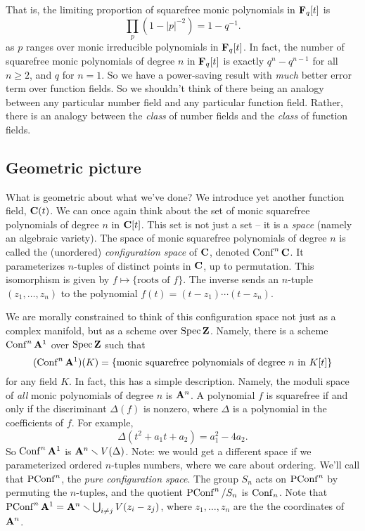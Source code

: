 That is, the limiting proportion of squarefree monic polynomials in 
$\mathbf{F}_q[t]$ is 
\[
  \prod_p \left(1-|p|^{-2}\right) = 1-q^{-1} .
\]
as $p$ ranges over monic irreducible polynomials in $\mathbf{F}_q[t]$. In fact, the 
number of squarefree monic polynomials of degree $n$ in $\mathbf{F}_q[t]$ is exactly 
$q^n-q^{n-1}$ for all $n\geqslant 2$, and $q$ for $n=1$. So we have a 
power-saving result with \emph{much} better error term over function fields. So 
we shouldn't think of there being an analogy between any particular number field 
and any particular function field. Rather, there is an analogy between the 
\emph{class} of number fields and the \emph{class} of function fields. 





\subsection{Geometric picture}

What is geometric about what we've done? We introduce yet another function 
field, $\mathbf{C}(t)$. We can once again think about the set of monic squarefree 
polynomials of degree $n$ in $\mathbf{C}[t]$. This set is not just a set -- it is a 
\emph{space} (namely an algebraic variety). The space of monic squarefree 
polynomials of degree $n$ is called the (unordered) \emph{configuration space} 
of $\mathbf{C}$, denoted $\operatorname{Conf}^n \mathbf{C}$. It parameterizes $n$-tuples of 
distinct points in $\mathbf{C}$, up to permutation. This isomorphism is given by 
$f\mapsto \{\text{roots of $f$}\}$. The inverse sends an $n$-tuple 
$(z_1,\dots,z_n)$ to the polynomial $f(t)=(t-z_1)\cdots(t-z_n)$. 

We are morally constrained to think of this configuration space not just as 
a complex manifold, but as a scheme over $\operatorname{Spec}\mathbf{Z}$. Namely, there is a 
scheme $\operatorname{Conf}^n \mathbf{A}^1$ over $\operatorname{Spec}\mathbf{Z}$ such that 
\[
  (\operatorname{Conf}^n\mathbf{A}^1)(K) = \{\text{monic squarefree polynomials of degree $n$ in $K[t]$}\}
\]
for any field $K$. In fact, this has a simple description. Namely, the moduli 
space of \emph{all} monic polynomials of degree $n$ is $\mathbf{A}^n$. A polynomial $f$ 
is squarefree if and only if the discriminant $\Delta(f)$ is nonzero, where 
$\Delta$ is a polynomial in the coefficients of $f$. For example, 
\[
  \Delta(t^2+a_1 t+a_2) = a_1^2 - 4 a_2 .
\]
So $\operatorname{Conf}^n\mathbf{A}^1$ is $\mathbf{A}^n\smallsetminus V(\Delta)$. Note: we would 
get a different space if we parameterized ordered $n$-tuples numbers, where 
we care about ordering. We'll call that $\operatorname{PConf}^n$, the 
\emph{pure configuration space}. The group $S_n$ acts on $\operatorname{PConf}^n$ 
by permuting the $n$-tuples, and the quotient 
$\operatorname{PConf}^n/S_n$ is $\operatorname{Conf}_n$. Note that 
$\operatorname{PConf}^n\mathbf{A}^1=\mathbf{A}^n\smallsetminus \bigcup_{i\ne j} V(z_i-z_j)$, 
where $z_1,\dots,z_n$ are the the coordinates of $\mathbf{A}^n$. 

